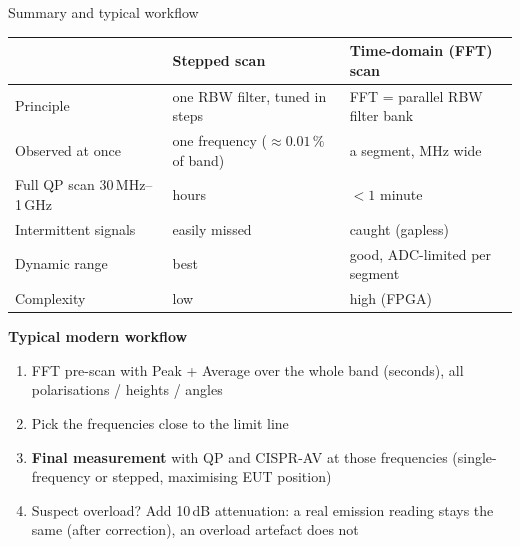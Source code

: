 \documentclass[aspectratio=169]{beamer}
\begin{document}
\begin{frame}{Summary and typical workflow}

\centering
\footnotesize
\begin{tabular}{@{}lll@{}}
  \toprule
  & \textcolor{stepc}{\textbf{Stepped scan}}
  & \textcolor{fftc}{\textbf{Time-domain (FFT) scan}} \\
  \midrule
  Principle        & one RBW filter, tuned in steps
                   & FFT = parallel RBW filter bank \\
  Observed at once & one frequency ($\approx 0.01\,\%$ of band)
                   & a segment, MHz wide \\
  Full QP scan 30\,MHz--1\,GHz & hours & $<1$ minute \\
  Intermittent signals & easily missed & caught (gapless) \\
  Dynamic range    & best & good, ADC-limited per segment \\
  Complexity       & low  & high (FPGA) \\
  \bottomrule
\end{tabular}

\medskip
\raggedright
\small
\textbf{Typical modern workflow}
\begin{enumerate}
  \item \textcolor{fftc}{FFT pre-scan} with Peak + Average over the whole band
        (seconds), all polarisations / heights / angles
  \item Pick the frequencies close to the limit line
  \item \textbf{Final measurement} with QP and CISPR-AV at those frequencies
        (single-frequency or stepped, maximising EUT position)
  \item Suspect overload? Add 10\,dB attenuation: a real emission reading
        stays the same (after correction), an overload artefact does not
\end{enumerate}

\end{frame}
\end{document}
